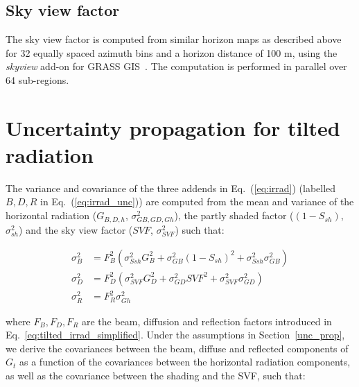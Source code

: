 \subsection*{Sky view factor}

The sky view factor is computed from similar horizon maps as described above for 32 equally spaced azimuth bins and a horizon distance of 100 m, using the \textit{skyview} add-on for GRASS GIS~\cite{zaksek_sky-view_2011}. The computation is performed in parallel over 64 sub-regions.


\section{Uncertainty propagation for tilted radiation}
\label{unc_Gt}

The variance and covariance of the three addends in Eq.~(\ref{eq:irrad}) (labelled $B, D, R$ in Eq.~(\ref{eq:irrad_unc})) are computed from the mean and variance of the horizontal radiation ($G_{B,D,h}$, $\sigma^2_{GB,GD,Gh}$), the partly shaded factor ($(1-S_{sh})$, $\sigma^2_{sh}$) and the sky view factor ($\mathit{SVF}$, $\sigma^2_{\mathit{SVF}}$) such that:

\begin{equation}
\begin{aligned}
\sigma^2_{B} & = F_{B}^2 (\sigma^2_{\mathit{Ssh}} G_B^2 + \sigma^2_{GB} (1-S_{sh})^2 + \sigma^2_{\mathit{Ssh}} \sigma^2_{GB}) \\
\sigma^2_{D} & = F_{D}^2 (\sigma^2_{\mathit{SVF}} G_D^2 + \sigma^2_{GD} \mathit{SVF}^2 + \sigma^2_{\mathit{SVF}} \sigma^2_{GD}) \\
\sigma^2_{R}&  = F_{R}^2 \sigma^2_{Gh}
\end{aligned}
\end{equation}

where $F_{B}, F_{D}, F_{R}$ are the beam, diffusion and reflection factors introduced in Eq.~\ref{eq:tilted_irrad_simplified}. 
Under the assumptions in Section~\ref{unc_prop}, we derive the covariances between the beam, diffuse and reflected components of $G_t$ as a function of the covariances between the horizontal radiation components, as well as the covariance between the shading and the SVF, such that:

